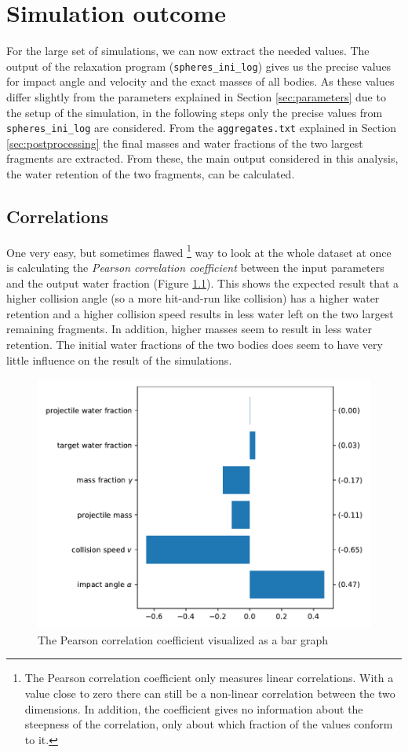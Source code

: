 \chapter{Simulation outcome}
\label{chapter:results}

For the large set of simulations, we can now extract the needed values. The output of the relaxation program (\texttt{spheres\_ini\_log}) gives us the precise values for impact angle and velocity and the exact masses of all bodies. As these values differ slightly from the parameters explained in Section \ref{sec:parameters} due to the setup of the simulation, in the following steps only the precise values from \texttt{spheres\_ini\_log} are considered. From the \texttt{aggregates.txt} explained in Section \ref{sec:postprocessing} the final masses and water fractions of the two largest fragments are extracted. From these, the main output considered in this analysis, the water retention of the two fragments, can be calculated. 

\section{Correlations}
\label{sec:cov}
One very easy, but sometimes flawed%
\footnote{The Pearson correlation coefficient only measures linear correlations. With a value close to zero there can still be a non-linear correlation between the two dimensions. In addition, the coefficient gives no information about the steepness of the correlation, only about which fraction of the values conform to it.} 
way to look at the whole dataset at once is calculating the \textit{Pearson correlation coefficient} between the input parameters and the output water fraction (Figure \ref{fig:cov}). This shows the expected result that a higher collision angle (so a more hit-and-run like collision) has a higher water retention and a higher collision speed results in less water left on the two largest remaining fragments. In addition, higher masses seem to result in less water retention. The initial water fractions of the two bodies does seem to have very little influence on the result of the simulations.

\begin{figure}[h]
	\centering
	\includegraphics[width=0.6\linewidth]{images/cov.pdf}
	\caption{The Pearson correlation coefficient visualized as a bar graph}
	\label{fig:cov}
\end{figure}
